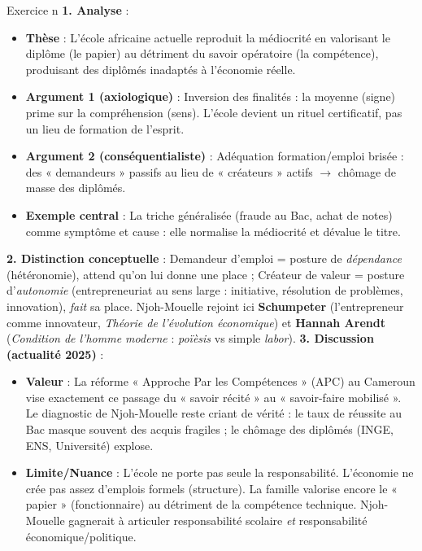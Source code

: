 \documentclass[11pt]{article}
\begin{document}
\begin{corrige}{Exercice n}
\textbf{1. Analyse} : 
\begin{itemize}
    \item \textbf{Thèse} : L'école africaine actuelle reproduit la médiocrité en valorisant le diplôme (le papier) au détriment du savoir opératoire (la compétence), produisant des diplômés inadaptés à l'économie réelle.
    \item \textbf{Argument 1 (axiologique)} : Inversion des finalités : la moyenne (signe) prime sur la compréhension (sens). L'école devient un rituel certificatif, pas un lieu de formation de l'esprit.
    \item \textbf{Argument 2 (conséquentialiste)} : Adéquation formation/emploi brisée : des « demandeurs » passifs au lieu de « créateurs » actifs $\rightarrow$ chômage de masse des diplômés.
    \item \textbf{Exemple central} : La triche généralisée (fraude au Bac, achat de notes) comme symptôme et cause : elle normalise la médiocrité et dévalue le titre.
\end{itemize}
\textbf{2. Distinction conceptuelle} : \guillemotleft Demandeur d'emploi \guillemotright = posture de \emph{dépendance} (hétéronomie), attend qu'on lui donne une place ; \guillemotleft Créateur de valeur \guillemotright = posture d'\emph{autonomie} (entrepreneuriat au sens large : initiative, résolution de problèmes, innovation), \emph{fait} sa place. Njoh-Mouelle rejoint ici \textbf{Schumpeter} (l'entrepreneur comme innovateur, \emph{Théorie de l'évolution économique}) et \textbf{Hannah Arendt} (\emph{Condition de l'homme moderne} : \emph{poïèsis} vs simple \emph{labor}).
\textbf{3. Discussion (actualité 2025)} : 
\begin{itemize}
    \item \textbf{Valeur} : La réforme « Approche Par les Compétences » (APC) au Cameroun vise exactement ce passage du « savoir récité » au « savoir-faire mobilisé ». Le diagnostic de Njoh-Mouelle reste criant de vérité : le taux de réussite au Bac masque souvent des acquis fragiles ; le chômage des diplômés (INGE, ENS, Université) explose.
    \item \textbf{Limite/Nuance} : L'école ne porte pas seule la responsabilité. L'économie ne crée pas assez d'emplois formels (structure). La famille valorise encore le « papier » (fonctionnaire) au détriment de la compétence technique. Njoh-Mouelle gagnerait à articuler responsabilité scolaire \emph{et} responsabilité économique/politique.
\end{itemize}
\end{corrige}
\end{document}
